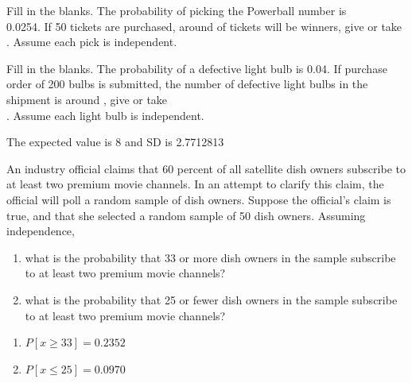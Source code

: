 \documentclass[11pt, chapterprefix=true]{scrbook}\usepackage[]{graphicx}\usepackage[]{color}
\begin{document}
\begin{exercises}
\begin{solution}
  \end{solution}

	\begin{exercise}  %

Fill in the blanks. The probability of picking the Powerball number is \\ 0.0254. If 50 tickets are purchased, around \underline{\phantom{xxxxxxxx}} of  tickets will be winners,  give or take  \underline{\phantom{xxxxxxxx}}.    Assume each pick is independent.
	\end{exercise}
%

		\begin{exercise}  %

Fill in the blanks. The probability of a defective light bulb is 0.04. If purchase order of 200 bulbs is submitted, the number of defective light bulbs in the shipment is around \underline{\phantom{xxxxxxxx}}, give or take \\ \underline{\phantom{xxxxxxxx}}. Assume each light bulb is independent.
	  \end{exercise}
	  \begin{solution}  %


The expected value is 8 and SD is 2.7712813
	\end{solution}

  \begin{exercise}   %

An industry official claims that 60 percent of all satellite dish owners subscribe to at least two premium movie channels.  In an attempt to clarify this claim, the official will poll a random sample of dish owners.  Suppose the official's claim is true, and that she selected a random sample of 50 dish owners.  Assuming independence,

\begin{enumerate}
\item what is the probability that 33 or more dish owners in the sample subscribe to at least two premium movie channels?
\item what is the probability that 25 or fewer dish owners in the sample subscribe to at least two premium movie channels?
\end{enumerate}
\end{exercise}
\begin{solution}



\begin{enumerate}
\item $P[ x \ge 33] = 0.2352$
\item $P[ x \le 25] = 0.0970$
\end{enumerate}

\end{solution}
 
\end{exercises}
 
\end{document}
